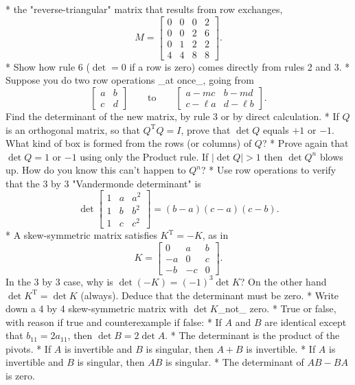 * the "reverse-triangular" matrix that results from row exchanges, \[M=\begin{bmatrix}0&0&0&2\\ 0&0&2&6\\ 0&1&2&2\\ 4&4&8&8\end{bmatrix}.\]
* Show how rule 6 (\(\det=0\) if a row is zero) comes directly from rules 2 and 3.
* Suppose you do two row operations _at once_, going from \[\begin{bmatrix}a&b\\ c&d\end{bmatrix}\qquad\text{to}\qquad\begin{bmatrix}a-mc&b-md\\ c-\ell a&d-\ell b\end{bmatrix}.\] Find the determinant of the new matrix, by rule 3 or by direct calculation.
* If \(Q\) is an orthogonal matrix, so that \(Q^{\mathrm{T}}Q=I\), prove that \(\det Q\) equals \(+1\) or \(-1\). What kind of box is formed from the rows (or columns) of \(Q\)?
* Prove again that \(\det Q=1\) or \(-1\) using only the Product rule. If \(|\det Q|>1\) then \(\det Q^{n}\) blows up. How do you know this can't happen to \(Q^{n}\)?
* Use row operations to verify that the 3 by 3 "Vandermonde determinant" is \[\det\begin{bmatrix}1&a&a^{2}\\ 1&b&b^{2}\\ 1&c&c^{2}\end{bmatrix}=(b-a)(c-a)(c-b).\]
* A skew-symmetric matrix satisfies \(K^{\mathrm{T}}=-K\), as in \[K=\begin{bmatrix}0&a&b\\ -a&0&c\\ -b&-c&0\end{bmatrix}.\] In the 3 by 3 case, why is \(\det(-K)=(-1)^{3}\det K\)? On the other hand \(\det K^{\mathrm{T}}=\det K\) (always). Deduce that the determinant must be zero.
* Write down a 4 by 4 skew-symmetric matrix with \(\det K\)_not_ zero.
* True or false, with reason if true and counterexample if false:
* If \(A\) and \(B\) are identical except that \(b_{11}=2a_{11}\), then \(\det B=2\det A\).
* The determinant is the product of the pivots.
* If \(A\) is invertible and \(B\) is singular, then \(A+B\) is invertible.
* If \(A\) is invertible and \(B\) is singular, then \(AB\) is singular.
* The determinant of \(AB-BA\) is zero.
 
